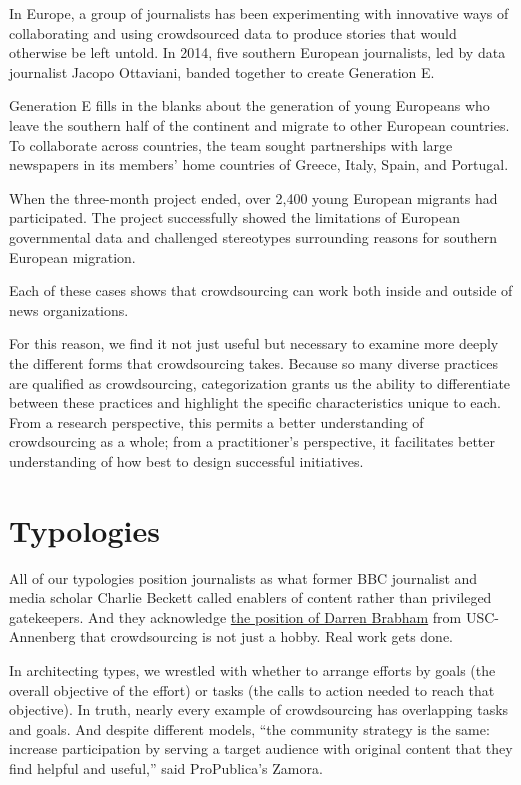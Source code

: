 \begin{itemize}
In Europe, a group of journalists has been experimenting with innovative ways of collaborating and using crowdsourced data to produce stories that would otherwise be left untold. In 2014, five southern European journalists, led by data journalist Jacopo Ottaviani, banded together to create Generation E. 

Generation E fills in the blanks about the generation of young Europeans who leave the southern half of the continent and migrate to other European countries. To collaborate across countries, the team sought partnerships with large newspapers in its members’ home countries of Greece, Italy, Spain, and Portugal.\autocite{Ottaviani}

When the three-month project ended, over 2,400 young European migrants had participated. The project successfully showed the limitations of European governmental data and challenged stereotypes surrounding reasons for southern European migration.\autocite{GE}

Each of these cases shows that crowdsourcing can work both inside and outside of news organizations. 

For this reason, we find it not just useful but necessary to examine more deeply the different forms that crowdsourcing takes. Because so many diverse practices are qualified as crowdsourcing, categorization grants us the ability to differentiate between these practices and highlight the specific characteristics unique to each. From a research perspective, this permits a better understanding of crowdsourcing as a whole; from a practitioner’s perspective, it facilitates better understanding of how best to design successful initiatives.

\chapter{Typologies}  

All of our typologies position journalists as what former BBC journalist and media scholar Charlie Beckett called enablers of content rather than privileged gatekeepers.\autocite{Beckett} And they acknowledge \href{https://dbrabham.files.wordpress.com/2012/09/brabham-2012-ics-the-myth-of-amateur-crowds.pdf}{the position of Darren Brabham} from USC-Annenberg that crowdsourcing is not just a hobby. Real work gets done.\autocite{Brabham}

In architecting types, we wrestled with whether to arrange efforts by goals (the overall objective of the effort) or tasks (the calls to action needed to reach that objective). In truth, nearly every example of crowdsourcing has overlapping tasks and goals. And despite different models, ``the community strategy is the same: increase participation by serving a target audience with original content that they find helpful and useful,'' said ProPublica’s Zamora.


\end{itemize}
